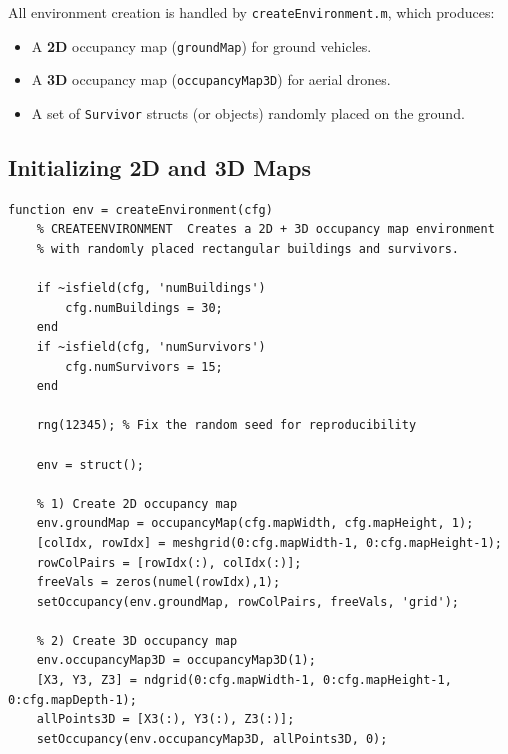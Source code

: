 \documentclass[12pt,a4paper]{report}
\begin{document}
All environment creation is handled by \texttt{createEnvironment.m}, which produces:
\begin{itemize}
    \item A \textbf{2D} occupancy map (\texttt{groundMap}) for ground vehicles.
    \item A \textbf{3D} occupancy map (\texttt{occupancyMap3D}) for aerial drones.
    \item A set of \texttt{Survivor} structs (or objects) randomly placed on the ground.
\end{itemize}

\subsection*{Initializing 2D and 3D Maps}

\begin{verbatim}
function env = createEnvironment(cfg)
    % CREATEENVIRONMENT  Creates a 2D + 3D occupancy map environment
    % with randomly placed rectangular buildings and survivors.

    if ~isfield(cfg, 'numBuildings')
        cfg.numBuildings = 30;
    end
    if ~isfield(cfg, 'numSurvivors')
        cfg.numSurvivors = 15;
    end

    rng(12345); % Fix the random seed for reproducibility

    env = struct();

    % 1) Create 2D occupancy map
    env.groundMap = occupancyMap(cfg.mapWidth, cfg.mapHeight, 1);
    [colIdx, rowIdx] = meshgrid(0:cfg.mapWidth-1, 0:cfg.mapHeight-1);
    rowColPairs = [rowIdx(:), colIdx(:)];
    freeVals = zeros(numel(rowIdx),1);
    setOccupancy(env.groundMap, rowColPairs, freeVals, 'grid');

    % 2) Create 3D occupancy map
    env.occupancyMap3D = occupancyMap3D(1);
    [X3, Y3, Z3] = ndgrid(0:cfg.mapWidth-1, 0:cfg.mapHeight-1, 0:cfg.mapDepth-1);
    allPoints3D = [X3(:), Y3(:), Z3(:)];
    setOccupancy(env.occupancyMap3D, allPoints3D, 0);
\end{verbatim}
\end{document}
